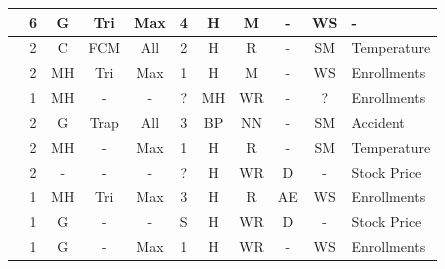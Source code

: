 \begin{center}
\begin{landscape}
\begin{longtable}[c]{|m{4cm}|c|c|c|c|c|c|c|c|c|m{5cm}|}
\cite{Jilani2008a}         & 6                  & G                  & Tri  & Max                & 4              & H                       & M              & -                        & WS            & -                     \\ \hline
\cite{Li2008b}             & 2                  & C            & FCM         & All                    & 2              & H                       & R                & -                        & SM              & Temperature           \\ \hline
\cite{Davari2009}          & 2                  & MH         & Tri  & Max                & 1              & H                       & M              & -                        & WS            & Enrollments           \\ \hline
\cite{Kuo2009}             & 1                  & MH         & -           & -                      & ?              & MH                             & WR      & -                        & ?                        & Enrollments           \\ \hline
\cite{Egrioglu2009}        & 2                  & G                  & Trap & All                    & 3              & BP                              & NN                 & -                        & SM              & Accident              \\ \hline
\cite{Hsu2010}             & 2                  & MH         & -           & Max                & 1              & H                       & R               & -                        & SM              & Temperature           \\ \hline
\cite{Chen2011}            & 2                  & -                     & -           & -                      & ?              & H                       & WR      & D                     & -                        & Stock Price           \\ \hline
\cite{Huang2011}           & 1                  & MH   & Tri  & Max                & 3              & H                       & R               & AE                 & WS            & Enrollments           \\ \hline
\cite{Lee2011}             & 1                  & G                  & -           & -                      & S       & H                       & WR      & D                     & -                        & Stock Price           \\ \hline
\cite{ismail2011enrollment}          & 1                  & G                  & -           & Max                & 1              & H                       & WR      & -                        & WS            & Enrollments           \\ \hline

\end{longtable}
\end{landscape}
\end{center}
